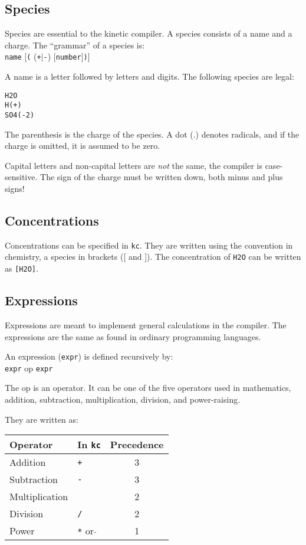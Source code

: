 \subsection{Species}
Species are essential to the kinetic compiler. A species consists of a name
and a charge. The ``grammar'' of a species is: \\
{\tt name} [{\tt (} ({\tt +}$|${\tt -}) [{\tt number}]{\tt )}] 

A name is a letter followed by letters and digits. The following species are
legal:
\begin{verbatim}
H2O
H(+)
SO4(-2)
\end{verbatim}

The parenthesis is the charge of the species. A dot (.) denotes
radicals, and if the charge is omitted, it is assumed to be zero.

Capital letters and non-capital letters are {\em not} the same, \ie the
compiler is case-sensitive. The sign of the charge must be written
down, \ie both minus and plus signs!

\subsection{Concentrations}
Concentrations can be specified in {\tt kc}. They are written using the
convention in chemistry, \ie a species in brackets ([ and ]). The 
concentration of {\tt H2O} can be written as {\tt [H2O]}.

\subsection{Expressions}
Expressions are meant to implement general calculations in the
compiler. The expressions are the same as found in ordinary
programming languages.

An expression ({\tt expr}) is defined recursively by:\\
{\tt expr} op {\tt expr}

The op is an operator. It can be one of the five operators used in
mathematics, \ie addition, subtraction, multiplication, division,
and power-raising.
 
They are written as:

\begin{center}
\begin{tabular}{llc}
\hline
Operator & In {\tt kc} & Precedence \\ \hline 
Addition & {\tt +}     & 3          \\  
Subtraction & {\tt -}  & 3          \\  
Multiplication & {\tt *} & 2        \\  
Division & {\tt /}     & 2          \\ 
Power    & {\tt **} or {\tt $\hat{}$} & 1 \\ 
\hline
\end{tabular}
\end{center}

